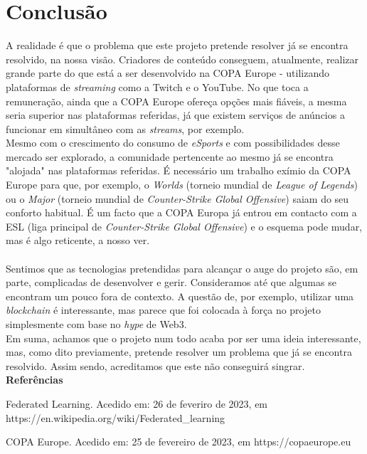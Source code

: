 \documentclass{llncs}
\begin{document}
\section{Conclusão}
A realidade é que o problema que este projeto pretende resolver já se encontra resolvido, na nossa visão. 
Criadores de conteúdo conseguem, atualmente, realizar grande parte do que está a ser desenvolvido na COPA Europe - utilizando plataformas de \emph{streaming} como a Twitch e o YouTube. No que toca a remuneração, ainda que a COPA Europe ofereça opções mais fiáveis, a mesma seria superior nas plataformas referidas, já que existem serviços de anúncios a funcionar em simultâneo com as \emph{streams}, por exemplo.
\\
Mesmo com o crescimento do consumo de \emph{eSports} e com possibilidades desse mercado ser explorado, a comunidade pertencente ao mesmo já se encontra "alojada" nas plataformas referidas. É necessário um trabalho exímio da COPA Europe para que, por exemplo, o \emph{Worlds} (torneio mundial de \emph{League of Legends}) ou o \emph{Major} (torneio mundial de \emph{Counter-Strike Global Offensive}) saiam do seu conforto habitual. É um facto que a COPA Europa já entrou em contacto com a ESL (liga principal de \emph{Counter-Strike Global Offensive}) e o esquema pode mudar, mas é algo reticente, a nosso ver.
\\
\\
Sentimos que as tecnologias pretendidas para alcançar o auge do projeto são, em parte, complicadas de desenvolver e gerir. Consideramos até que algumas se encontram um pouco fora de contexto. A questão de, por exemplo, utilizar uma \emph{blockchain} é interessante, mas parece que foi colocada à força no projeto simplesmente com base no \emph{hype} de Web3. \\
Em suma, achamos que o projeto num todo acaba por ser uma ideia interessante, mas, como dito previamente, pretende resolver um problema que já se encontra resolvido. Assim sendo, acreditamos que este não conseguirá singrar. \\

\noindent \large{\textbf{Referências}}

\begin{thebibliography}{9}

Federated Learning. Acedido em: 26 de feveriro de 2023, em https://en.wikipedia.org/wiki/Federated\_learning

COPA Europe. Acedido em: 25 de fevereiro de 2023, em https://copaeurope.eu

\end{thebibliography}
\end{document}
